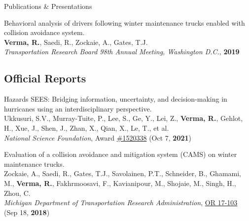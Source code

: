 \documentclass{res} %
\begin{document}
\begin{rSection}{Publications \& Presentations}
\begin{etaremune}
            \item Behavioral analysis of drivers following winter maintenance trucks enabled with collision avoidance system.
            \\ \textbf{Verma, R.}, Saedi, R., Zockaie, A., Gates, T.J.
            \\ \textit{Transportation Research Board 98th Annual Meeting, Washington D.C.}, \textbf{2019}
        \end{etaremune}

        \subsection*{Official Reports}
        \begin{etaremune}
            \item Hazards SEES: Bridging information, uncertainty, and decision-making in hurricanes using an interdisciplinary perspective.
            \\ Ukkusuri, S.V., Murray-Tuite, P., Lee, S., Ge, Y., Lei, Z., \textbf{Verma, R.}, Gehlot, H., Xue, J., Shen, J., Zhan, X., Qian, X., Le, T., et al.
            \\ \textit{National Science Foundation}, Award \href{https://www.nsf.gov/awardsearch/showAward?AWD_ID=1520338}{\#1520338} (Oct 7, \textbf{2021})

            \item Evaluation of a collision avoidance and mitigation system (CAMS) on winter maintenance trucks.
            \\ Zockaie, A., Saedi, R., Gates, T.J., Savolainen, P.T., Schneider, B., Ghamami, M., \textbf{Verma, R.}, Fakhrmoosavi, F., Kavianipour, M., Shojaie, M., Singh, H., Zhou, C.
            \\ \textit{Michigan Department of Transportation Research Administration}, \href{https://rosap.ntl.bts.gov/view/dot/42752}{OR 17-103} (Sep 18, \textbf{2018})
        \end{etaremune}

    \end{rSection}
\end{document}
